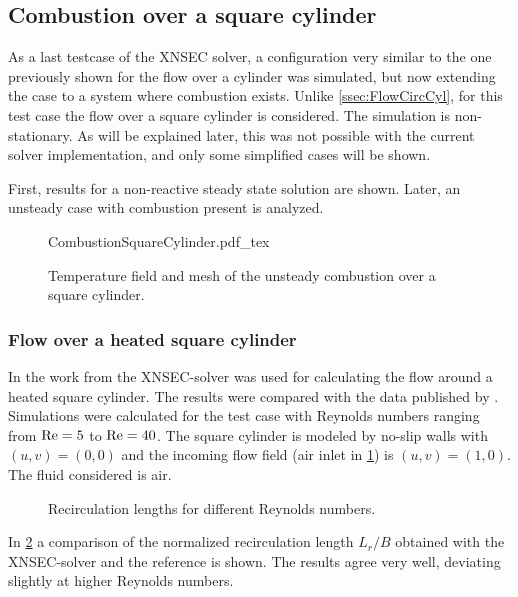 \FloatBarrier
\subsection{Combustion over a square cylinder}
As a last testcase of the XNSEC solver, a configuration very similar to the one previously shown for the flow over a cylinder was simulated, but now extending the case to a system where combustion exists. 
Unlike \cref{ssec:FlowCircCyl}, for this test case the flow over a square cylinder is considered.  The simulation is non-stationary. As will be explained later, this was not possible with the current solver implementation, and only some simplified cases will be shown. 


First, results for a non-reactive steady state solution are shown. Later, an unsteady case with combustion present is analyzed.
\begin{figure}[h]
	\begin{center}
		\def\svgwidth{0.8\textwidth}
		{CombustionSquareCylinder.pdf_tex}
		\caption{Temperature field and mesh of the unsteady combustion over a square cylinder.}
		\label{fig:CombustionSquareCylinder}
	\end{center}
\end{figure}


\subsubsection{Flow over a heated square cylinder}
In the work from \cite{miaoHighOrderSimulationLowMachFlows2022} the XNSEC-solver was used for calculating the flow around a heated square cylinder. The results were compared with the data published by \cite{sharmaHEATFLUIDFLOW2004}. Simulations were calculated for the test case with Reynolds numbers ranging from $\text{Re} = 5$ to $\text{Re} = 40$. The square cylinder is modeled by no-slip walls with $(u,v) = (0,0)$ and the incoming flow field (air inlet in \cref{fig:CombustionSquareCylinder}) is $(u,v) = (1,0)$. The fluid considered is air. 
\begin{figure}[h!]
	\centering
	\caption{Recirculation lengths for different Reynolds numbers.}
	\label{fig:RecirculationLength}
\end{figure}
In \cref{fig:RecirculationLength} a comparison of the normalized recirculation length $L_r/B$ obtained with the XNSEC-solver and the reference is shown. The results agree very well, deviating slightly at higher Reynolds numbers.


